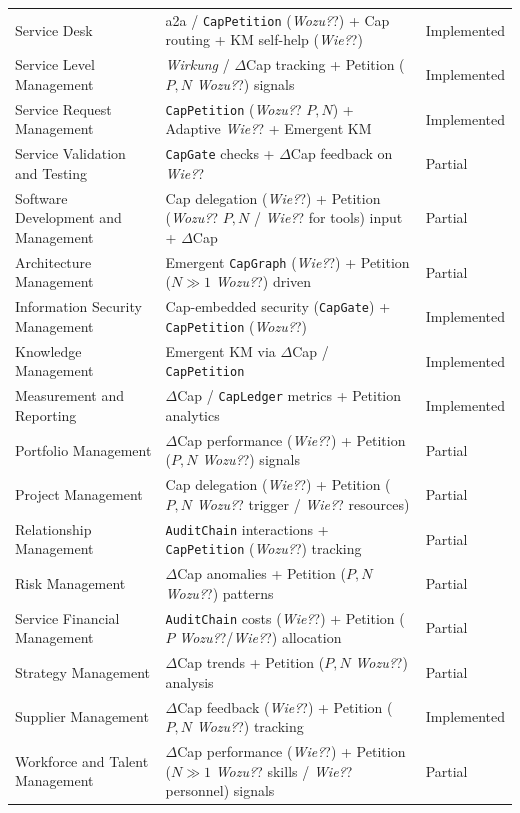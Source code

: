 \documentclass[12pt, a4paper]{scrartcl}
\newcommand{\DeltaCap}{$\Delta$Cap}                    %
\newcommand{\CapLedger}{\texttt{CapLedger}}          %
\newcommand{\Wirkung}{\textit{Wirkung}}                 %
\newcommand{\CapGate}{\texttt{CapGate}}
\newcommand{\AuditChain}{\texttt{AuditChain}}
\newcommand{\CapPetition}{\texttt{CapPetition}}        %
\newcommand{\Wozu}{\textit{Wozu?}}                      %
\newcommand{\Wie}{\textit{Wie?}}                        %
\begin{document}
\begin{landscape}
\begin{table}[htbp]
{\begin{tabular}{@{}lll@{}}
Service Desk & a2a / \CapPetition{} (\Wozu?) + Cap routing + KM self-help (\Wie?) & Implemented \\
Service Level Management & \Wirkung{} / \DeltaCap{} tracking + Petition ($P,N$ \Wozu?) signals & Implemented \\
Service Request Management & \CapPetition{} (\Wozu? $P,N$) + Adaptive \Wie? + Emergent KM & Implemented \\
Service Validation and Testing & \CapGate{} checks + \DeltaCap{} feedback on \Wie? & Partial \\
Software Development and Management & Cap delegation (\Wie?) + Petition (\Wozu? $P,N$ / \Wie? for tools) input + \DeltaCap{} & Partial \\
Architecture Management & Emergent \texttt{CapGraph} (\Wie?) + Petition ($N \gg 1$ \Wozu?) driven & Partial \\
Information Security Management & Cap-embedded security (\CapGate{}) + \CapPetition{} (\Wozu?) & Implemented \\
Knowledge Management & Emergent KM via \DeltaCap{} / \CapPetition{} & Implemented \\ %
Measurement and Reporting & \DeltaCap{} / \CapLedger{} metrics + Petition analytics & Implemented \\ %
Portfolio Management & \DeltaCap{} performance (\Wie?) + Petition ($P,N$ \Wozu?) signals & Partial \\
Project Management & Cap delegation (\Wie?) + Petition ($P,N$ \Wozu? trigger / \Wie? resources) & Partial \\
Relationship Management & \AuditChain{} interactions + \CapPetition{} (\Wozu?) tracking & Partial \\
Risk Management & \DeltaCap{} anomalies + Petition ($P,N$ \Wozu?) patterns & Partial \\
Service Financial Management & \AuditChain{} costs (\Wie?) + Petition ($P$ \Wozu?/\Wie?) allocation & Partial \\
Strategy Management & \DeltaCap{} trends + Petition ($P,N$ \Wozu?) analysis & Partial \\
Supplier Management & \DeltaCap{} feedback (\Wie?) + Petition ($P,N$ \Wozu?) tracking & Implemented \\
Workforce and Talent Management & \DeltaCap{} performance (\Wie?) + Petition ($N \gg 1$ \Wozu? skills / \Wie? personnel) signals & Partial \\
\bottomrule
\end{tabular}
}
\end{table}
\end{landscape}
\end{document}
